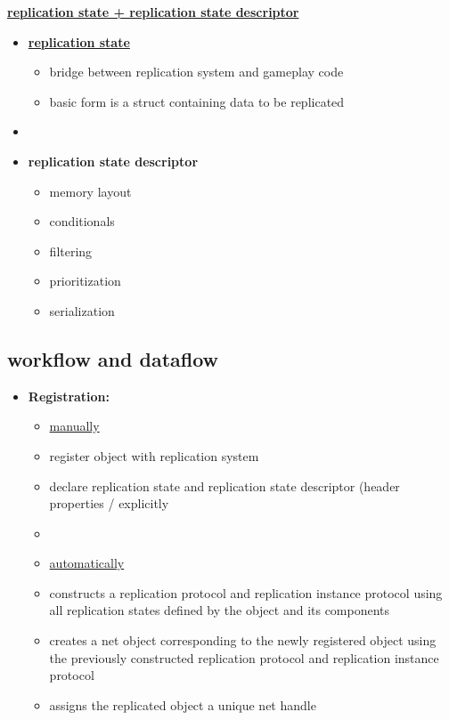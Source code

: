         \textbf{\uline{replication state + replication state descriptor}}
        \begin{itemize}
            \item \textbf{\uline{replication state}}
            \begin{itemize}
                \item bridge between replication system and gameplay code
                \item basic form is a struct containing data to be replicated
            \end{itemize}
            \item 
            \item \textbf{replication state descriptor}
            \begin{itemize}
                \item memory layout
                \item conditionals
                \item filtering
                \item prioritization
                \item serialization
            \end{itemize}
        \end{itemize}


        \subsection{workflow and dataflow}
            \begin{itemize}
                \item \textbf{Registration:}
                \begin{itemize}
                    \item \uline{manually}
                    \item register object with replication system
                    \item declare replication state and replication state descriptor (header properties / explicitly %
                    \item 
                    \item \uline{automatically}
                    \item constructs a replication protocol and replication instance protocol using all replication states defined by the object and its components
                    \item creates a net object corresponding to the newly registered object using the previously constructed replication protocol and replication instance protocol
                    \item assigns the replicated object a unique net handle
                \end{itemize}
            \end{itemize}
            
